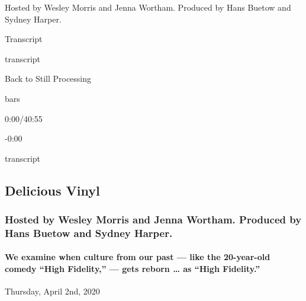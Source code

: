 Hosted by Wesley Morris and Jenna Wortham. Produced by Hans Buetow and
Sydney Harper.

Transcript

transcript

Back to Still Processing

bars

0:00/40:55

-0:00

transcript

\hypertarget{delicious-vinyl-2}{%
\subsection{Delicious Vinyl}\label{delicious-vinyl-2}}

\hypertarget{hosted-by-wesley-morris-and-jenna-wortham-produced-by-hans-buetow-and-sydney-harper-1}{%
\subsubsection{Hosted by Wesley Morris and Jenna Wortham. Produced by
Hans Buetow and Sydney
Harper.}\label{hosted-by-wesley-morris-and-jenna-wortham-produced-by-hans-buetow-and-sydney-harper-1}}

\hypertarget{we-examine-when-culture-from-our-past--like-the-20-year-old-comedy-high-fidelity--gets-reborn--as-high-fidelity-2}{%
\paragraph{We examine when culture from our past --- like the
20-year-old comedy ``High Fidelity,'' --- gets reborn \ldots{} as ``High
Fidelity.''}\label{we-examine-when-culture-from-our-past--like-the-20-year-old-comedy-high-fidelity--gets-reborn--as-high-fidelity-2}}

Thursday, April 2nd, 2020

